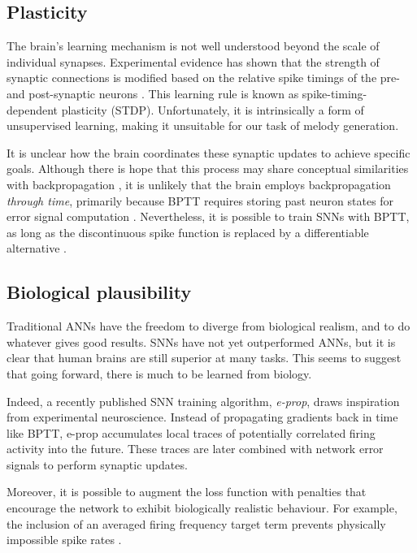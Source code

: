 \documentclass[../../report.tex]{subfiles}
\begin{document}
\subsection{Plasticity}

The brain's learning mechanism is not well understood beyond the scale of
individual synapses. Experimental evidence has shown that the strength of
synaptic connections is modified based on the relative spike timings of the pre-
and post-synaptic neurons \cite{Bliss1973}. This learning rule is known as
spike-timing-dependent plasticity (STDP). Unfortunately, it is intrinsically a
form of unsupervised learning, making it unsuitable for our task of melody
generation.

It is unclear how the brain coordinates these synaptic updates to achieve
specific goals. Although there is hope that this process may share conceptual
similarities with backpropagation \cite{Lillicrap2020}, it is unlikely that the
brain employs backpropagation \emph{through time}, primarily because BPTT
requires storing past neuron states for error signal computation
\cite{Lillicrap2019}. Nevertheless, it is possible to train SNNs with BPTT, as
long as the discontinuous spike function is replaced by a differentiable
alternative \cite{Bellec2018LSNN}.

\subsection{Biological plausibility}

Traditional ANNs have the freedom to diverge from biological realism, and to do
whatever gives good results. SNNs have not yet outperformed ANNs, but it is
clear that human brains are still superior at many tasks. This seems to suggest
that going forward, there is much to be learned from biology.

Indeed, a recently published SNN training algorithm, \emph{e-prop}, draws
inspiration from experimental neuroscience. Instead of propagating gradients
back in time like BPTT, e-prop accumulates local traces of potentially
correlated firing activity into the future. These traces are later combined with
network error signals\footnotemark{} to perform synaptic updates.
\cite{Bellec2020}


Moreover, it is possible to augment the loss function with penalties that
encourage the network to exhibit biologically realistic behaviour. For example,
the inclusion of an averaged firing frequency target term prevents physically
impossible spike rates \cite{Bellec2018LSNN}.
\end{document}
